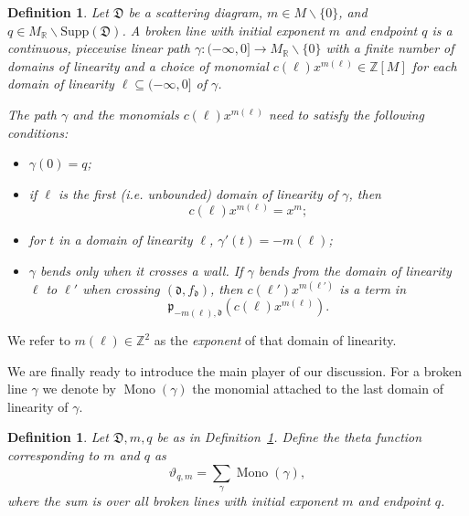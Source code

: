 \documentclass[11pt]{amsart}
\newtheorem{defn}[theorem]{Definition}
\theoremstyle{remark}
\numberwithin{equation}{section}
\newcommand{\RR}{\mathbb{R}}
\newcommand{\ZZ}{\mathbb{Z}}
\newcommand{\fd}{\mathfrak{d}}
\newcommand{\fD}{\mathfrak{D}}
\newcommand{\fp}{\mathfrak{p}}
\newcommand{\Mono}{\operatorname{Mono}}
\begin{document}
\begin{defn} 
  \label{brokendef}
  Let $\fD$ be a scattering diagram, $m \in M \smallsetminus \{0\}$, and $q \in
  M_{\RR} \smallsetminus \text{Supp}(\fD)$.  A \emph{broken line} with initial
  \emph{exponent} $m$ and endpoint $q$ is a continuous, piecewise linear path
  $\gamma : ( - \infty , 0] \rightarrow M_{\mathbb{R}} \smallsetminus \{ 0\} $ with
  a finite number of domains of linearity and a choice of monomial
  $c(\ell) x^{m(\ell)} \in \ZZ[M]$ for each domain of linearity $\ell \subseteq ( -
  \infty, 0]$ of $\gamma$. 
  
  The path $\gamma$ and the monomials $c(\ell) x^{m(\ell)}$ need to satisfy the
  following conditions:
  \begin{itemize}
    \item $\gamma(0) = q$;
    \item if $\ell$ is the first (i.e. unbounded) domain of linearity of $\gamma$, then 
      \[c(\ell) x^{m(\ell)} = x^{m};\]
    \item for $t$ in a domain of linearity $\ell$, $\gamma'(t) = -m(\ell)$;
    \item $\gamma$ bends only when it crosses a wall. If $\gamma$ bends from the
      domain of linearity $\ell$ to $ \ell'$ when crossing $(\fd, f_{\fd})$, then
      $c(\ell')x^{m(\ell')}$ is a term in 
      \[\fp_{-m(\ell), \fd} \left(c(\ell) x^{m(\ell)}\right).\]
  \end{itemize}
\end{defn}
We refer to $m(\ell)\in \mathbb{Z}^2$ as the \emph{exponent} of that domain
of linearity.

We are finally ready to introduce the main player of our discussion.
For a broken line $\gamma$ we denote by $\Mono(\gamma)$ the monomial attached to the last domain of linearity of $\gamma$.
\begin{defn}
  Let $\fD, m, q$ be as in Definition~\ref{brokendef}.  Define the \emph{theta function} corresponding to $m$ and $q$
  as
  \[ 
    \vartheta_{q, m} = \sum_{\gamma} \Mono (\gamma), 
  \] 
  where the sum is over all broken lines with initial exponent $m$ and endpoint
  $q$.
\end{defn}
\end{document}
